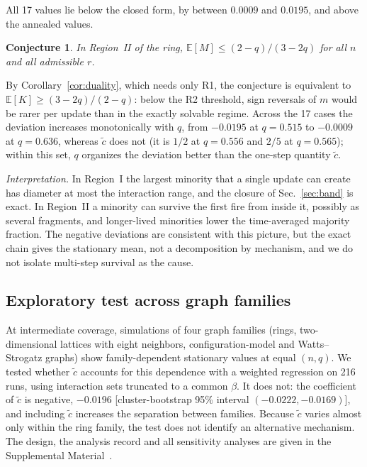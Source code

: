 \documentclass[aps,pre,reprint,superscriptaddress,amsmath,amssymb,longbibliography]{revtex4-2}
\newtheorem{conjecture}{Conjecture}
\theoremstyle{remark}
\newcommand{\ctil}{\tilde c}
\newcommand{\E}{\mathbb{E}}
\begin{document}
All 17 values lie below the closed form, by between $0.0009$ and
$0.0195$, and above the annealed values.

\begin{conjecture}
\label{conj:upper}
In Region~II of the ring, $\E[M]\le(2-q)/(3-2q)$ for all $n$ and all
admissible $r$.
\end{conjecture}

By Corollary~\ref{cor:duality}, which needs only R1, the conjecture is
equivalent to $\E[K]\ge(3-2q)/(2-q)$: below the R2 threshold, sign
reversals of $m$ would be rarer per update than in the exactly solvable
regime. Across the 17 cases the deviation increases monotonically with
$q$, from $-0.0195$ at $q=0.515$ to $-0.0009$ at $q=0.636$, whereas
$\ctil$ does not (it is $1/2$ at $q=0.556$ and $2/5$ at $q=0.565$); within
this set, $q$ organizes the deviation better than the one-step
quantity $\ctil$.

\emph{Interpretation.} In Region~I the largest minority that a single
update can create has diameter at most the interaction range, and the
closure of Sec.~\ref{sec:band} is exact. In Region~II a minority can
survive the first fire from inside it, possibly as several fragments,
and longer-lived minorities lower the time-averaged majority fraction.
The negative deviations are consistent with this picture, but the exact
chain gives the stationary mean, not a decomposition by mechanism, and
we do not isolate multi-step survival as the cause.

\subsection{Exploratory test across graph families}

At intermediate coverage, simulations of four graph families (rings,
two-dimensional lattices with eight neighbors, configuration-model and
Watts--Strogatz graphs) show family-dependent stationary values at equal
$(n,q)$. We tested whether $\ctil$ accounts for this dependence with a
weighted regression on 216 runs, using interaction sets truncated to a
common $\beta$. It does not: the coefficient of $\ctil$ is negative,
$-0.0196$ [cluster-bootstrap 95\% interval $(-0.0222,-0.0169)$], and
including $\ctil$ increases the separation between families. Because
$\ctil$ varies almost only within the ring family, the test does not
identify an alternative mechanism. The design, the analysis record and
all sensitivity analyses are given in the Supplemental
Material~\cite{SM}.
\end{document}
